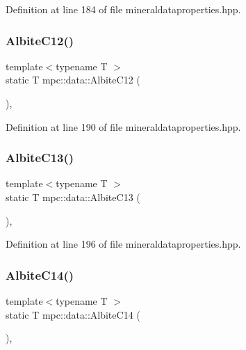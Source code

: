 Definition at line 184 of file mineraldataproperties.\+hpp.

\mbox{\label{namespacempc_1_1data_a54f2b1fa5ba8a083a0b879c37d79e93f}} 
\subsubsection{\texorpdfstring{Albite\+C12()}{AlbiteC12()}}
{\footnotesize\ttfamily template$<$typename T $>$ \\
static T mpc\+::data\+::\+Albite\+C12 (\begin{DoxyParamCaption}{ }\end{DoxyParamCaption})\hspace{0.3cm}{\ttfamily [inline]}, {\ttfamily [static]}}



Definition at line 190 of file mineraldataproperties.\+hpp.

\mbox{\label{namespacempc_1_1data_aa7369eb2c82919fe6fff2b09778a556b}} 
\subsubsection{\texorpdfstring{Albite\+C13()}{AlbiteC13()}}
{\footnotesize\ttfamily template$<$typename T $>$ \\
static T mpc\+::data\+::\+Albite\+C13 (\begin{DoxyParamCaption}{ }\end{DoxyParamCaption})\hspace{0.3cm}{\ttfamily [inline]}, {\ttfamily [static]}}



Definition at line 196 of file mineraldataproperties.\+hpp.

\mbox{\label{namespacempc_1_1data_acf3383c56c283133ceff8ecc6f09c309}} 
\subsubsection{\texorpdfstring{Albite\+C14()}{AlbiteC14()}}
{\footnotesize\ttfamily template$<$typename T $>$ \\
static T mpc\+::data\+::\+Albite\+C14 (\begin{DoxyParamCaption}{ }\end{DoxyParamCaption})\hspace{0.3cm}{\ttfamily [inline]}, {\ttfamily [static]}}



